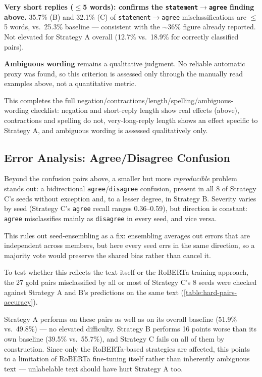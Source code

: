 \textbf{Very short replies ($\leq$5 words): confirms the
\texttt{statement}$\to$\texttt{agree} finding above.} 35.7\% (B) and
32.1\% (C) of \texttt{statement}$\to$\texttt{agree} misclassifications
are $\leq$5 words, vs.\ 25.3\% baseline --- consistent with the
$\sim$36\% figure already reported. Not elevated for Strategy A overall
(12.7\% vs.\ 18.9\% for correctly classified pairs).

\textbf{Ambiguous wording} remains a qualitative judgment. No reliable
automatic proxy was found, so this criterion is assessed only through
the manually read examples above, not a quantitative metric.

This completes the full negation/contractions/length/spelling/ambiguous-
wording checklist: negation and short-reply length show real effects
(above), contractions and spelling do not, very-long-reply length shows
an effect specific to Strategy A, and ambiguous wording is assessed
qualitatively only.

\subsection{Error Analysis: Agree/Disagree Confusion}
\label{sec:error-analysis}

Beyond the confusion pairs above, a smaller but more \emph{reproducible}
problem stands out: a bidirectional
\texttt{agree}/\texttt{disagree} confusion, present in all 8 of Strategy
C's seeds without exception and, to a lesser degree, in Strategy B.
Severity varies by seed (Strategy C's \texttt{agree} recall ranges
0.36--0.59), but direction is constant: \texttt{agree} misclassifies
mainly as \texttt{disagree} in every seed, and vice versa.

This rules out seed-ensembling as a fix: ensembling averages out errors
that are independent across members, but here every seed errs in the same
direction, so a majority vote would preserve the shared bias rather than
cancel it.

To test whether this reflects the text itself or the RoBERTa training
approach, the 27 gold pairs misclassified by all or most of Strategy C's 8
seeds were checked against Strategy A and B's predictions on the same
text (\autoref{table:hard-pairs-accuracy}).

Strategy A performs on these pairs as well as on its overall baseline
(51.9\% vs.\ 49.8\%) --- no elevated difficulty. Strategy B performs 16
points worse than its own baseline (39.5\% vs.\ 55.7\%), and Strategy C
fails on all of them by construction. Since only the RoBERTa-based
strategies are affected, this points to a limitation of RoBERTa
fine-tuning itself rather than inherently ambiguous text --- unlabelable
text should have hurt Strategy A too.

